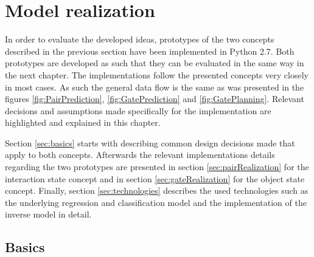 \chapter{Model realization\label{chap:modelReal}}




In order to evaluate the developed ideas, prototypes of the two concepts described in the previous section have been implemented in Python 2.7. Both prototypes are developed as such that they can be evaluated in the same way in the next chapter. The implementations follow the presented concepts very closely in most cases. As such the general data flow is the same as was presented in the figures  \ref{fig:PairPrediction}, \ref{fig:GatePrediction} and \ref{fig:GatePlanning}.
Relevant decisions and assumptions made specifically for the implementation are highlighted and explained in this chapter. %

Section \ref{sec:basics} starts with describing common design decisions made that apply to both concepts. Afterwards the relevant implementations details regarding the two prototypes are presented in section \ref{sec:pairRealization} for the interaction state concept and in section \ref{sec:gateRealization} for the object state concept. Finally, section \ref{sec:technologies} describes the used technologies such as the underlying regression and classification model and the implementation of the inverse model in detail.

\section{Basics \label{sec:basics}}


